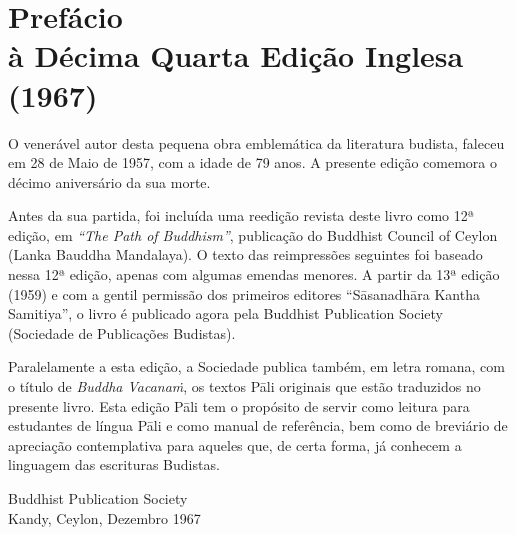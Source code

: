 \chapter[Prefácio à Décima Quarta Edição Inglesa (1967)]{Prefácio\\ à Décima Quarta Edição Inglesa\\ (1967)}

O venerável autor desta pequena obra emblemática da literatura budista, faleceu
em 28 de Maio de 1957, com a idade de 79 anos. A presente edição comemora o
décimo aniversário da sua morte.

Antes da sua partida, foi incluída uma reedição revista deste livro como 12ª
edição, em \emph{“The Path of Buddhism”}, publicação do Buddhist Council of
Ceylon (Lanka Bauddha Mandalaya). O texto das reimpressões seguintes foi baseado
nessa 12ª edição, apenas com algumas emendas menores. A partir da 13ª edição
(1959) e com a gentil permissão dos primeiros editores “Sāsanadhāra Kantha
Samitiya”, o livro é publicado agora pela Buddhist Publication Society
(Sociedade de Publicações Budistas).

Paralelamente a esta edição, a Sociedade publica também, em letra romana, com o
título de \emph{Buddha Vacanaṁ}, os textos Pāli originais que estão traduzidos
no presente livro. Esta edição Pāli tem o propósito de servir como leitura para
estudantes de língua Pāli e como manual de referência, bem como de breviário de
apreciação contemplativa para aqueles que, de certa forma, já conhecem a
linguagem das escrituras Budistas.

\bigskip

{\raggedleft
  Buddhist Publication Society\\
  Kandy, Ceylon, Dezembro 1967
\par}
